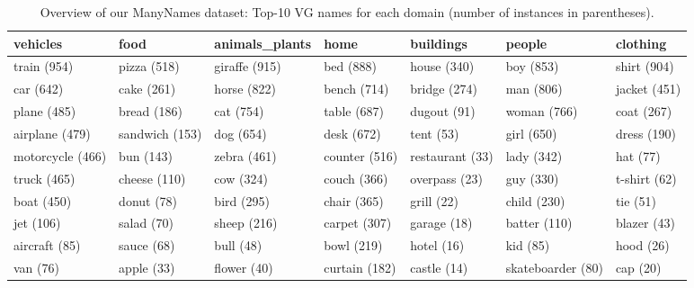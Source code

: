\documentclass[11pt,a4paper]{article}
\begin{document}
\begin{table}[htp]
	\small
	\centering
	\begin{tabular}{@{~}l@{~}l@{~}l@{~}l@{~}l@{~}l@{~}l}
		\toprule
		vehicles &            food & animals\_plants &           home &        buildings &             people &      clothing \\
		\midrule
		train (954) &  pizza (518) &  giraffe (915) &  bed (888) &  house (340) &  boy (853) &  shirt (904) \\
		car (642) &  cake (261) &  horse (822) &  bench (714) &  bridge (274) &  man (806) &  jacket (451) \\
		plane (485) &  bread (186) &  cat (754) &  table (687) &  dugout (91) &  woman (766) &  coat (267) \\
		airplane (479) &  sandwich (153) &  dog (654) &  desk (672) &  tent (53) &  girl (650) &  dress (190) \\
		motorcycle (466) &  bun (143) &  zebra (461) &  counter (516) &  restaurant (33) &  lady (342) &  hat (77) \\
		truck (465) &  cheese (110) &  cow (324) &  couch (366) &  overpass (23) &  guy (330) &  t-shirt (62) \\
		boat (450) &  donut (78) &  bird (295) &  chair (365) &  grill (22) &  child (230) &  tie (51) \\
		jet (106) &  salad (70) &  sheep (216) &  carpet (307) &  garage (18) &  batter (110) &  blazer (43) \\
		aircraft (85) &  sauce (68) &  bull (48) &  bowl (219) &  hotel (16) &  kid (85) &  hood (26) \\
		van (76) &  apple (33) &  flower (40) &  curtain (182) &  castle (14) &  skateboarder (80) &  cap (20) \\
		\bottomrule
	\end{tabular}
	\caption{Overview of our ManyNames dataset: Top-10 VG names for each domain (number of instances in parentheses). %
		\label{tab:overview_dataset1}}
\end{table}
\end{document}
